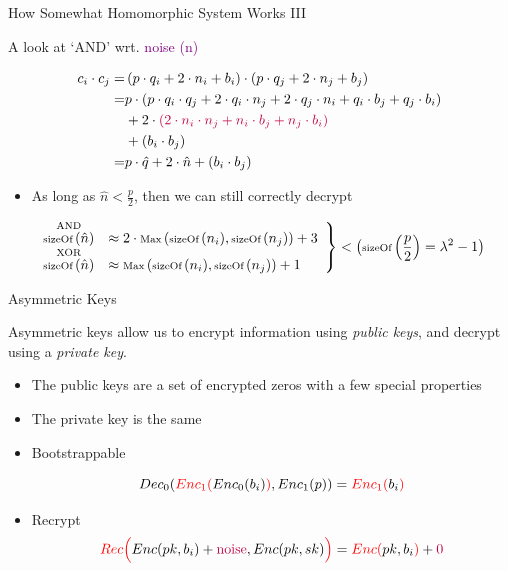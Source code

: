 \documentclass[dvips,11pt]{beamer}
\newcommand{\sizeOf}[1]{\text{{\scriptsize sizeOf}}\left( {#1} \right)}
\newcommand{\maxf}[2]{\text{{\scriptsize Max}}\left( {#1},{#2} \right)}
\begin{document}
\begin{frame}{How Somewhat Homomorphic System Works III}
  \begin{center}
    A look at `AND' wrt. \textcolor{purple}{noise (n)}
  \end{center}
  \begin{align*}
    c_i\cdot c_j =&\left(p\cdot q_i + 2\cdot n_i + b_i\right)\cdot\left(p\cdot q_j + 2\cdot n_j + b_j\right)\\
    =&
    p\cdot(p\cdot q_i\cdot q_j + 2\cdot  q_i \cdot  n_j + 2\cdot  q_j \cdot  n_i + q_i\cdot b_j + q_j\cdot b_i)\\ 
    &+ 2\cdot \textcolor{purple}{(2\cdot n_i\cdot n_j + n_i\cdot b_j + n_j\cdot b_i)}\\
    &+ (b_i\cdot b_j)\\
    =&p\cdot\hat{q} + 2\cdot\hat{n} + \left(b_i\cdot b_j\right)
  \end{align*} 
  
  
  
  \begin{itemize}
  \item As long as \(\hat{n} < \frac{p}{2}\), then we can still correctly decrypt
  \end{itemize}
  \[
  \left.
  \begin{array}{rl}
    \stackrel{\text{{\scriptsize AND}}}{\sizeOf{\hat{n}}}&\approx2\cdot\maxf{\sizeOf{n_i}}{\sizeOf{n_j}}+3\\
    \stackrel{\text{{\scriptsize XOR}}}{\sizeOf{\hat{n}}}&\approx\maxf{\sizeOf{n_i}}{\sizeOf{n_j}}+1\\
  \end{array}
  \right\} < \big(\sizeOf{\frac{p}{2}}=\lambda^2-1\big)
  \]

\end{frame}


\begin{frame}{ Asymmetric Keys }
  
  Asymmetric keys allow us to encrypt information using {\em public keys}, and decrypt using a {\em private key}. 
  
  \begin{itemize}
  \item The public keys are a set of encrypted zeros with a few special properties
  \item The private key is the same
  \item Bootstrappable
    
    \[
    Dec_0(\textcolor{red}{Enc_1(}Enc_0(b_i)
    \textcolor{red}{)},
    Enc_1(p)
    ) 
    =\textcolor{red}{Enc_1(}b_i\textcolor{red}{)}
    \]
    
  \item Recrypt
    \[
    \textcolor{red}{Rec\Big(}Enc(pk,b_i)
    +\textcolor{purple}{\text{noise}},Enc(pk,sk)\textcolor{red}{\Big)} 
    =\textcolor{red}{Enc(}pk,b_i\textcolor{red}{)}
    +\textcolor{purple}{\text{0}}
    \]
    
    
  \end{itemize}

\end{frame}
\end{document}
